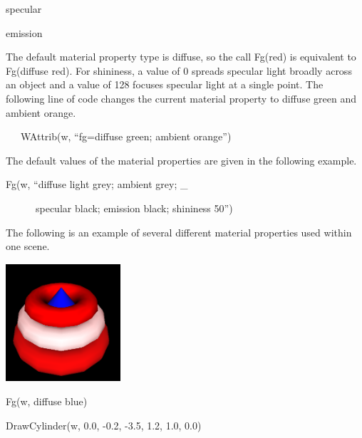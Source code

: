 \documentclass[letterpaper]{article}
\begin{document}
{\ttfamily
\textsf{specular}\ \ }

{\sffamily
emission}


\bigskip

{
The default material property type is diffuse, so the call \textsf{Fg({\textquotedbl}red{\textquotedbl})} is equivalent
to \textsf{Fg({\textquotedbl}diffuse red{\textquotedbl})}. For shininess, a value of 0 spreads specular light broadly
across an object and a value of 128 focuses specular light at a single point. The following line of code changes the
current material property to diffuse green and ambient orange. }


\bigskip

{\ttfamily
\ \ \ \textsf{WAttrib(w, ``fg=diffuse green; ambient orange'')}}


\bigskip

{
The default values of the material properties are given in the following example. }


\bigskip

{\sffamily
Fg(w, ``diffuse light grey; ambient grey; \_}

{\sffamily
\ \ \ \ \ \ specular black; emission black; shininess 50'')}


\bigskip

{
The following is an example of several different material properties used within one scene. }

{\centering  \includegraphics[width=1.6799in,height=1.7299in]{utr9/utr9-img024.png} \par}

\bigskip


\bigskip

{\sffamily
Fg(w, {\textquotedbl}diffuse blue{\textquotedbl})}

{\sffamily
DrawCylinder(w, 0.0, -0.2, -3.5, 1.2, 1.0, 0.0)}
\end{document}
